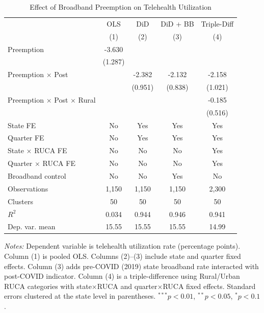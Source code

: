 \begin{table}[htbp]
\centering
\begin{threeparttable}
\caption{Effect of Broadband Preemption on Telehealth Utilization}
\label{tab:main}
\begin{tabular}{lcccc}
\toprule
 & OLS & DiD & DiD + BB & Triple-Diff \\
 & (1) & (2) & (3) & (4) \\
\midrule
Preemption & -3.630 & & & \\
 & (1.287) & & & \\
Preemption $\times$ Post & & -2.382 & -2.132 & -2.158 \\
 & & (0.951) & (0.838) & (1.021) \\
Preemption $\times$ Post $\times$ Rural & & & & -0.185 \\
 & & & & (0.516) \\
\midrule
State FE & No & Yes & Yes & Yes \\
Quarter FE & No & Yes & Yes & Yes \\
State $\times$ RUCA FE & No & No & No & Yes \\
Quarter $\times$ RUCA FE & No & No & No & Yes \\
Broadband control & No & No & Yes & No \\
Observations & 1,150 & 1,150 & 1,150 & 2,300 \\
Clusters & 50 & 50 & 50 & 50 \\
$R^2$ & 0.034 & 0.944 & 0.946 & 0.941 \\
Dep. var. mean & 15.55 & 15.55 & 15.55 & 14.99 \\
\bottomrule
\end{tabular}
\begin{tablenotes}[flushleft]\footnotesize
\item \textit{Notes:} Dependent variable is telehealth utilization rate (percentage points). Column (1) is pooled OLS. Columns (2)--(3) include state and quarter fixed effects. Column (3) adds pre-COVID (2019) state broadband rate interacted with post-COVID indicator. Column (4) is a triple-difference using Rural/Urban RUCA categories with state$\times$RUCA and quarter$\times$RUCA fixed effects. Standard errors clustered at the state level in parentheses. $^{***}p<0.01$, $^{**}p<0.05$, $^{*}p<0.1$.
\end{tablenotes}
\end{threeparttable}
\end{table}


